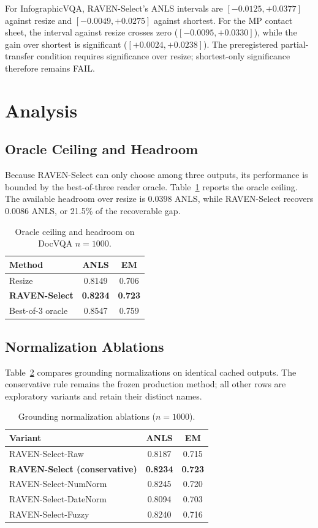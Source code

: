 \documentclass[journal]{IEEEtran}
\begin{document}
For InfographicVQA, RAVEN-Select's ANLS intervals are
$[-0.0125,+0.0377]$ against resize and $[-0.0049,+0.0275]$ against shortest.
For the MP contact sheet, the interval against resize crosses zero
($[-0.0095,+0.0330]$), while the gain over shortest is significant
($[+0.0024,+0.0238]$).  The preregistered partial-transfer condition requires
significance over resize; shortest-only significance therefore remains FAIL.

\section{Analysis}
\subsection{Oracle Ceiling and Headroom}
Because RAVEN-Select can only choose among three outputs, its performance is
bounded by the best-of-three reader oracle.  Table~\ref{tab:oracle} reports the
oracle ceiling.  The available headroom over resize is 0.0398 ANLS, while
RAVEN-Select recovers 0.0086 ANLS, or 21.5\% of the recoverable gap.

\begin{table}[t]
\centering
\caption{Oracle ceiling and headroom on DocVQA $n=1000$.}
\label{tab:oracle}
\begin{tabular}{lcc}
\toprule
Method & ANLS & EM\\
\midrule
Resize & 0.8149 & 0.706\\
\textbf{RAVEN-Select} & \textbf{0.8234} & \textbf{0.723}\\
Best-of-3 oracle & 0.8547 & 0.759\\
\bottomrule
\end{tabular}
\end{table}

\subsection{Normalization Ablations}
Table~\ref{tab:norm} compares grounding normalizations on identical cached
outputs.  The conservative rule remains the frozen production method; all other
rows are exploratory variants and retain their distinct names.

\begin{table}[t]
\centering
\caption{Grounding normalization ablations ($n=1000$).}
\label{tab:norm}
\begin{tabular}{lcc}
\toprule
Variant & ANLS & EM\\
\midrule
RAVEN-Select-Raw & 0.8187 & 0.715\\
\textbf{RAVEN-Select (conservative)} & \textbf{0.8234} & \textbf{0.723}\\
RAVEN-Select-NumNorm & 0.8245 & 0.720\\
RAVEN-Select-DateNorm & 0.8094 & 0.703\\
RAVEN-Select-Fuzzy & 0.8240 & 0.716\\
\bottomrule
\end{tabular}
\end{table}
\end{document}

